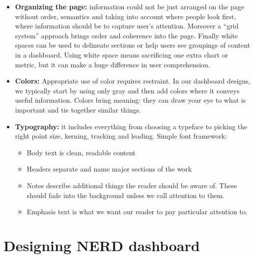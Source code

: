 \documentclass[a4paper,13pt]{report}
\begin{document}
\begin{itemize}
\item \textbf{Organizing the page: } information could not be just arranged on the page without order, semantics and taking into account where people look first, where information should be to capture user's attention.
Moreover a ``grid system'' approach brings order and coherence into the page. Finally white spaces can be used to delineate sections or help users see groupings of content in a dashboard. Using white space means sacrificing one extra chart or metric, but it can make a huge difference in user comprehension.

\item \textbf{Colors:}
Appropriate use of color requires restraint. In our dashboard designs, we typically start by using only gray and then add colors where it conveys useful information.
Colors bring meaning: they can draw your eye to what is important and tie together similar things.

\item \textbf{Typography: }it includes everything from choosing a typeface to picking the right point size, kerning, tracking and leading.
Simple font framework:
\begin{itemize}                                    
\item Body text is clean, readable content
\item Headers separate and name major sections of the work                                                       
\item Notes describe additional things the reader should be aware of. These should fade into the background unless we call attention to them.
\item Emphasis text is what we want our reader to pay particular attention to.   
\end{itemize}
\end{itemize}

\chapter{Designing NERD dashboard}
\end{document}
